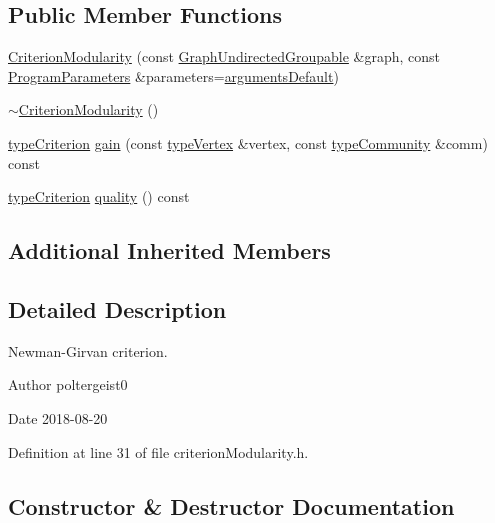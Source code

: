 \subsection*{Public Member Functions}
\begin{DoxyCompactItemize}
\item 
\hyperlink{classCriterionModularity_a10cef5036f6748045aa87295c4b9ab6c}{Criterion\+Modularity} (const \hyperlink{classGraphUndirectedGroupable}{Graph\+Undirected\+Groupable} \&graph, const \hyperlink{structProgramParameters}{Program\+Parameters} \&parameters=\hyperlink{program_8h_ae2d819404495f80f31db7676c1329d19}{arguments\+Default})
\item 
\hyperlink{classCriterionModularity_a37d3f5ffcf397ec89e63c24705860496}{$\sim$\+Criterion\+Modularity} ()
\item 
\hyperlink{criterionInterface_8h_af71ff22f6355fd69a4a62104bfd59a83}{type\+Criterion} \hyperlink{classCriterionModularity_a181617050bab1eeaaf38b2ad30dcfc43}{gain} (const \hyperlink{edge_8h_a5fbd20c46956d479cb10afc9855223f6}{type\+Vertex} \&vertex, const \hyperlink{graphUndirectedGroupable_8h_a914da95c9ea7f14f4b7f875c36818556}{type\+Community} \&comm) const
\item 
\hyperlink{criterionInterface_8h_af71ff22f6355fd69a4a62104bfd59a83}{type\+Criterion} \hyperlink{classCriterionModularity_adf9197fd4e5878ca86501447b1fba989}{quality} () const
\end{DoxyCompactItemize}
\subsection*{Additional Inherited Members}


\subsection{Detailed Description}
Newman-\/\+Girvan criterion. 

\begin{DoxyAuthor}{Author}
poltergeist0
\end{DoxyAuthor}
\begin{DoxyDate}{Date}
2018-\/08-\/20 
\end{DoxyDate}


Definition at line 31 of file criterion\+Modularity.\+h.



\subsection{Constructor \& Destructor Documentation}
\mbox{\label{classCriterionModularity_a10cef5036f6748045aa87295c4b9ab6c}} 
